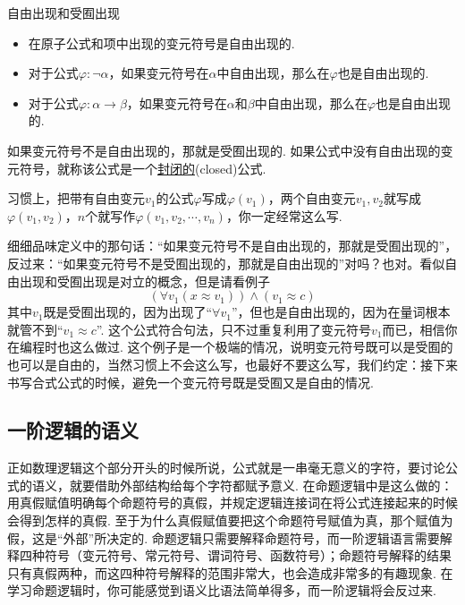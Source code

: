 \begin{definition}{自由出现和受囿出现}
    \begin{itemize}
        \item 在原子公式和项中出现的变元符号是自由出现的.
        \item 对于公式\(\varphi: \neg \alpha\)，如果变元符号在\(\alpha\)中自由出现，那么在\(\varphi\)也是自由出现的.
        \item 对于公式\(\varphi: \alpha \to \beta\)，如果变元符号在\(\alpha\)和\(\beta\)中自由出现，那么在\(\varphi\)也是自由出现的.
    \end{itemize}
    如果变元符号不是自由出现的，那就是受囿出现的. 如果公式中没有自由出现的变元符号，就称该公式是一个\underline{封闭的}(closed)公式.
\end{definition}

\begin{reference}
    习惯上，把带有自由变元\(v_1\)的公式\(\varphi\)写成\(\varphi(v_1)\)，两个自由变元\(v_1,v_2\)就写成\(\varphi(v_1,v_2)\)，\(n\)个就写作\(\varphi(v_1, v_2, \cdots, v_n)\)，你一定经常这么写. 
\end{reference}

细细品味定义中的那句话：“如果变元符号不是自由出现的，那就是受囿出现的”，反过来：“如果变元符号不是受囿出现的，那就是自由出现的”对吗？也对。看似自由出现和受囿出现是对立的概念，但是请看例子
\[(\forall v_1(x \approx v_1)) \wedge (v_1 \approx c)\]
其中\(v_1\)既是受囿出现的，因为出现了“\(\forall v_1\)”，但也是自由出现的，因为在量词根本就管不到“\(v_1 \approx c\)”. 这个公式符合句法，只不过重复利用了变元符号\(v_1\)而已，相信你在编程时也这么做过. 这个例子是一个极端的情况，说明变元符号既可以是受囿的也可以是自由的，当然习惯上不会这么写，也最好不要这么写，我们约定：接下来书写合式公式的时候，避免一个变元符号既是受囿又是自由的情况.


\subsection{一阶逻辑的语义}

正如数理逻辑这个部分开头的时候所说，公式就是一串毫无意义的字符，要讨论公式的语义，就要借助外部结构给每个字符都赋予意义. 在命题逻辑中是这么做的：用真假赋值明确每个命题符号的真假，并规定逻辑连接词在将公式连接起来的时候会得到怎样的真假. 至于为什么真假赋值要把这个命题符号赋值为真，那个赋值为假，这是“外部”所决定的. 命题逻辑只需要解释命题符号，而一阶逻辑语言需要解释四种符号（变元符号、常元符号、谓词符号、函数符号）；命题符号解释的结果只有真假两种，而这四种符号解释的范围非常大，也会造成非常多的有趣现象. 在学习命题逻辑时，你可能感觉到语义比语法简单得多，而一阶逻辑将会反过来.

